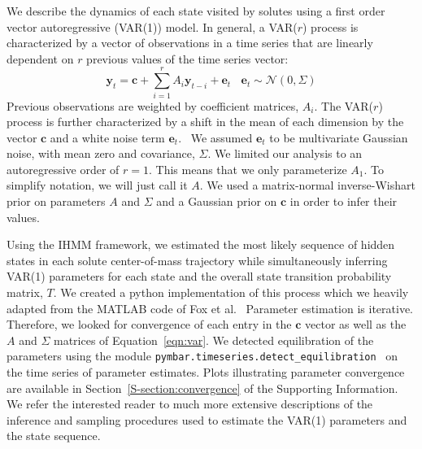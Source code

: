 \documentclass[journal=jpcbfk,manuscript=article]{achemso}
\begin{document}
  We describe the dynamics of each state visited by solutes using a first order vector 
  autoregressive (VAR(1)) model. In general, a VAR($r$) process is characterized by a
  vector of observations in a time series that are linearly dependent on $r$ previous
  values of the time series vector:
  \begin{equation}
  	\mathbf{y}_t = \mathbf{c} + \sum_{i=1}^r A_i\mathbf{y}_{t-i} + \mathbf{e}_t~~~~\mathbf{e}_t \sim \mathcal{N}(0, \Sigma)
  \label{eqn:var}
  \end{equation}
  Previous observations are weighted by coefficient matrices, $A_i$. The VAR($r$) 
  process is further characterized by a shift in the mean of each dimension by the
  vector $\mathbf{c}$ and a white noise term $\mathbf{e}_t$.~\cite{hamilton_time_1994}
  We assumed $\mathbf{e}_t$ to be multivariate Gaussian noise, with mean zero and
  covariance, $\Sigma$. We limited our analysis to an autoregressive order of $r=1$.
  This means that we only parameterize $A_1$. To simplify notation, we will just
  call it $A$. We used a matrix-normal inverse-Wishart prior on parameters $A$ and 
  $\Sigma$ and a Gaussian prior on $\mathbf{c}$ in order to infer their 
  values.~\cite{fox_nonparametric_2009}
   
  Using the IHMM framework, we estimated the most likely sequence of hidden states in
  each solute center-of-mass trajectory while simultaneously inferring VAR(1)
  parameters for each state and the overall state transition probability matrix, $T$.
  We created a python implementation of this process which we heavily adapted from
  the MATLAB code of Fox et al.~\cite{fox_bayesian_2010} Parameter estimation is iterative. 
  Therefore, we looked for convergence of each entry in the $\mathbf{c}$ vector as well
  as the $A$ and $\Sigma$ matrices of Equation~\ref{eqn:var}. We detected equilibration 
  of the parameters using the module \texttt{pymbar.timeseries.detect\_equilibration}~\cite{chodera_simple_2016} on
  the time series of parameter estimates. Plots illustrating parameter convergence are 
  available in Section~\ref{S-section:convergence} of the Supporting Information. We 
  refer the interested reader to much more extensive descriptions of the inference and 
  sampling procedures used to estimate the VAR(1) parameters and the state sequence. ~\cite{beal_infinite_2002,teh_hierarchical_2006,van_gael_beam_2008,fox_nonparametric_2009,fox_bayesian_2010}
\end{document}
